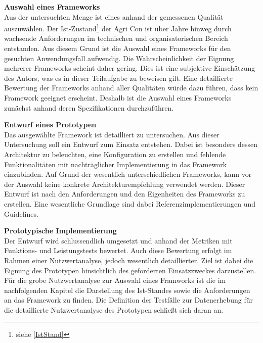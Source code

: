 \textbf{Auswahl eines Frameworks}\\
Aus der untersuchten Menge ist eines anhand der gemessenen Qualität auszuwählen.
Der Ist-Zustand\footnote{siehe \ref{IstStand}} der Agri Con ist über Jahre hinweg durch wachsende  Anforderungen im technischen und organisatorischen Bereich entstanden.
Aus diesem Grund ist die Auswahl eines Frameworks für den gesuchten Anwendungsfall aufwendig.
Die Wahrscheinlichkeit der Eignung mehrerer Frameworks scheint daher gering.
Dies ist eine subjektive Einschätzung des Autors, was es in dieser Teilaufgabe zu beweisen gilt.
Eine detaillierte Bewertung der Frameworks anhand aller Qualitäten würde dazu führen, dass kein Framework geeignet erscheint.
Deshalb ist die Auswahl eines Frameworks zunächst anhand deren Spezifikationen durchzuführen.

\textbf{Entwurf eines Prototypen}\\
Das ausgewählte Framework ist detailliert zu untersuchen.
Aus dieser Untersuchung soll ein Entwurf zum Einsatz entstehen.
Dabei ist besonders dessen Architektur zu beleuchten, eine Konfiguration zu erstellen und fehlende Funktionalitäten mit nachträglicher Implementierung in das Framework einzubinden.
Auf Grund der wesentlich unterschiedlichen Frameworks, kann vor der Auswahl keine konkrete Architekturempfehlung verwendet werden. Dieser Entwurf ist nach den Anforderungen und den Eigenheiten des Frameworks zu erstellen. Eine wesentliche Grundlage sind dabei Referenzimplementierungen und Guidelines.

\textbf{Prototypische Implementierung}\\
Der Entwurf wird schlussendlich umgesetzt und anhand der Metriken mit Funktions- und Leistungstests bewertet.
Auch diese Bewertung erfolgt im Rahmen einer Nutzwertanalyse, jedoch wesentlich detaillierter.
Ziel ist dabei die Eignung des Prototypen hinsichtlich des geforderten Einsatzzweckes darzustellen.\\


Für die grobe Nutzwertanalyse zur Auswahl eines Framworks ist die im nachfolgenden Kapitel die Darstellung des Ist-Standes sowie die Anforderungen an das Framework zu finden.
Die Definition der Testfälle zur Datenerhebung für die detaillierte Nutzwertanalyse des Prototypen schließt sich daran an.